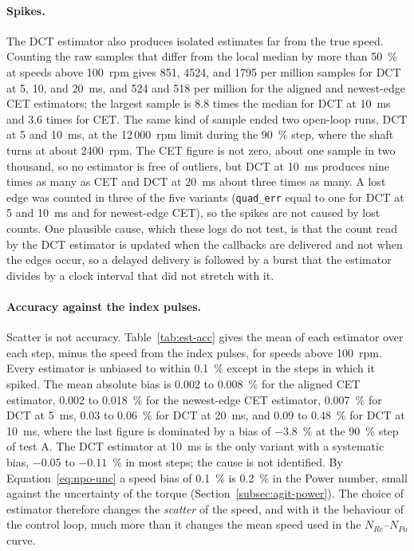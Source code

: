 \paragraph{Spikes.}
The DCT estimator also produces isolated estimates far from the true speed. Counting the raw samples that differ from the local median by more than 50~\% at speeds above 100~rpm gives 851, 4524, and 1795 per million samples for DCT at 5, 10, and 20~ms, and 524 and 518 per million for the aligned and newest-edge CET estimators; the largest sample is 8.8 times the median for DCT at 10~ms and 3.6 times for CET. The same kind of sample ended two open-loop runs, DCT at 5 and 10~ms, at the 12\,000~rpm limit during the 90~\% step, where the shaft turns at about 2400~rpm. The CET figure is not zero, about one sample in two thousand, so no estimator is free of outliers, but DCT at 10~ms produces nine times as many as CET and DCT at 20~ms about three times as many. A lost edge was counted in three of the five variants (\texttt{quad\_err} equal to one for DCT at 5 and 10~ms and for newest-edge CET), so the spikes are not caused by lost counts. One plausible cause, which these logs do not test, is that the count read by the DCT estimator is updated when the callbacks are delivered and not when the edges occur, so a delayed delivery is followed by a burst that the estimator divides by a clock interval that did not stretch with it.

\paragraph{Accuracy against the index pulses.}
Scatter is not accuracy. Table~\ref{tab:est-acc} gives the mean of each estimator over each step, minus the speed from the index pulses, for speeds above 100~rpm. Every estimator is unbiased to within 0.1~\% except in the steps in which it spiked. The mean absolute bias is 0.002 to 0.008~\% for the aligned CET estimator, 0.002 to 0.018~\% for the newest-edge CET estimator, 0.007~\% for DCT at 5~ms, 0.03 to 0.06~\% for DCT at 20~ms, and 0.09 to 0.48~\% for DCT at 10~ms, where the last figure is dominated by a bias of $-3.8$~\% at the 90~\% step of test A. The DCT estimator at 10~ms is the only variant with a systematic bias, $-0.05$ to $-0.11$~\% in most steps; the cause is not identified. By Equation~\ref{eq:npo-unc} a speed bias of 0.1~\% is 0.2~\% in the Power number, small against the uncertainty of the torque (Section~\ref{subsec:agit-power}). The choice of estimator therefore changes the \emph{scatter} of the speed, and with it the behaviour of the control loop, much more than it changes the mean speed used in the $N_{Re}$--$N_{Po}$ curve.

